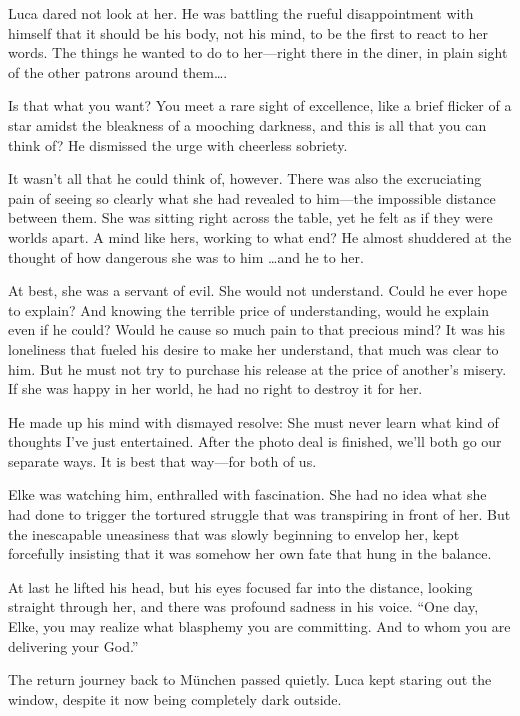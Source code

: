 Luca dared not look at her. He was battling the rueful disappointment with himself that it should be his body, not his mind, to be the first to react to her words. The things he wanted to do to her---right there in the diner, in plain sight of the other patrons around them\ldots.

Is that what you want? You meet a rare sight of excellence, like a brief flicker of a star amidst the bleakness of a mooching darkness, and this is all that you can think of? He dismissed the urge with cheerless sobriety.

It wasn't all that he could think of, however. There was also the excruciating pain of seeing so clearly what she had revealed to him---the impossible distance between them. She was sitting right across the table, yet he felt as if they were worlds apart. A mind like hers, working to what end? He almost shuddered at the thought of how dangerous she was to him \ldots and he to her.

At best, she was a servant of evil. She would not understand. Could he ever hope to explain? And knowing the terrible price of understanding, would he explain even if he could? Would he cause so much pain to that precious mind? It was his loneliness that fueled his desire to make her understand, that much was clear to him. But he must not try to purchase his release at the price of another's misery. If she was happy in her world, he had no right to destroy it for her.

He made up his mind with dismayed resolve: She must never learn what kind of thoughts I've just entertained. After the photo deal is finished, we'll both go our separate ways. It is best that way---for both of us.

Elke was watching him, enthralled with fascination. She had no idea what she had done to trigger the tortured struggle that was transpiring in front of her. But the inescapable uneasiness that was slowly beginning to envelop her, kept forcefully insisting that it was somehow her own fate that hung in the balance.

At last he lifted his head, but his eyes focused far into the distance, looking straight through her, and there was profound sadness in his voice. ``One day, Elke, you may realize what blasphemy you are committing. And to whom you are delivering your God.''

\sectionline

The return journey back to München passed quietly. Luca kept staring out the window, despite it now being completely dark outside.

